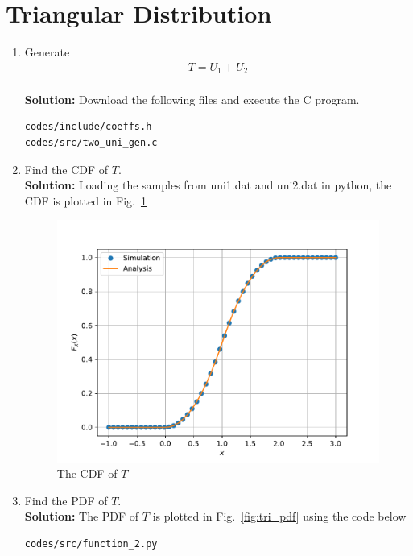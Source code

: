 \documentclass[journal,10pt,twocolumn]{article}
\newcommand\figref{Fig.~\ref}
\newcommand{\solution}{\noindent \textbf{Solution: }}
\begin{document}
\section{Triangular Distribution}
%
\begin{enumerate}
\item Generate 
	\begin{align}
		T = U_1+U_2
	\end{align}\\
\solution Download the following files and execute the  C program.
\begin{lstlisting}
codes/include/coeffs.h
codes/src/two_uni_gen.c
\end{lstlisting}
\item Find the CDF of $T$.\\
\solution Loading the samples from uni1.dat and uni2.dat in python, the CDF is plotted in \figref{fig:tri_cdf} 
\begin{figure}[h]
\centering
\includegraphics[width=\columnwidth]{./chapters/ch2/figs/tri_cdf.pdf}
\caption{The CDF of $T$}
\label{fig:tri_cdf}
\end{figure}
\item Find the PDF of $T$.\\
\solution The PDF of $T$ is plotted in \figref{fig:tri_pdf} using the code below
\begin{lstlisting}
codes/src/function_2.py
\end{lstlisting}
\begin{figure}[h]
\centering

\end{figure}
\end{enumerate}
\end{document}

